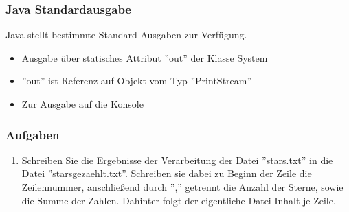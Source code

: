 \begin{frame}[fragile]
\frametitle{Java Standardausgabe}
	Java stellt bestimmte Standard-Ausgaben zur Verfügung.
	\begin{itemize}
	  \item Ausgabe über statisches Attribut ''out'' der Klasse System
	  \item ''out'' ist Referenz auf Objekt vom Typ ''PrintStream''
	  \item Zur Ausgabe auf die Konsole
	\end{itemize}
\end{frame}

\begin{frame}
	\frametitle{Aufgaben}
	\begin{enumerate}
	  \item Schreiben Sie die Ergebnisse der Verarbeitung der Datei
	  ''stars.txt'' in die Datei ''starsgezaehlt.txt''. Schreiben sie dabei zu
	  Beginn der Zeile die Zeilennummer, anschließend durch '','' getrennt die
	  Anzahl der Sterne, sowie die Summe der Zahlen. Dahinter folgt der eigentliche
	  Datei-Inhalt je Zeile.
	\end{enumerate}
\end{frame}
